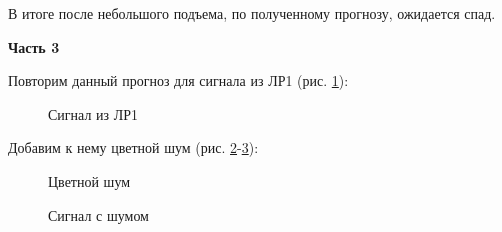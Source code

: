 \documentclass[a4paper,oneside,14pt]{extreport}
\begin{document}
В итоге после небольшого подъема, по полученному прогнозу, ожидается спад.

\newpage
\textbf{Часть 3}

Повторим данный прогноз для сигнала из ЛР1 (рис. \ref{task3_signal}):
\begin{figure}[!h]
	\caption{Сигнал из ЛР1}
	\label{task3_signal}
\end{figure}

Добавим к нему цветной шум (рис. \ref{task3_noise}-\ref{task3_signal_noise}):
\begin{figure}[!h]
	\caption{Цветной шум}
	\label{task3_noise}
\end{figure}

\newpage
\begin{figure}[!h]
	\caption{Сигнал с шумом}
	\label{task3_signal_noise}
\end{figure}
\end{document}
